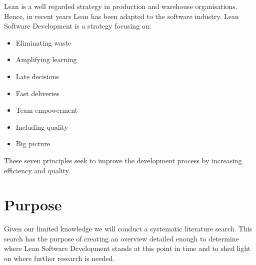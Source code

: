 Lean is a well regarded strategy in production and warehouse organisations. Hence, in recent years Lean has been adapted to the software industry. 
Lean Software Development is a strategy focusing on: 
\begin{itemize}
	\item Eliminating waste
	\item Amplifying learning
	\item Late decisions
	\item Fast deliveries
	\item Team empowerment
	\item Including quality
	\item Big picture
\end{itemize}
These seven principles seek to improve the development process by increasing efficiency and quality.

\section{Purpose}
Given our limited knowledge we will conduct a systematic literature search.
This search has the purpose of creating an overview detailed enough to determine where Lean Software Development stands at this point in time and to shed light on where further research is needed. 
